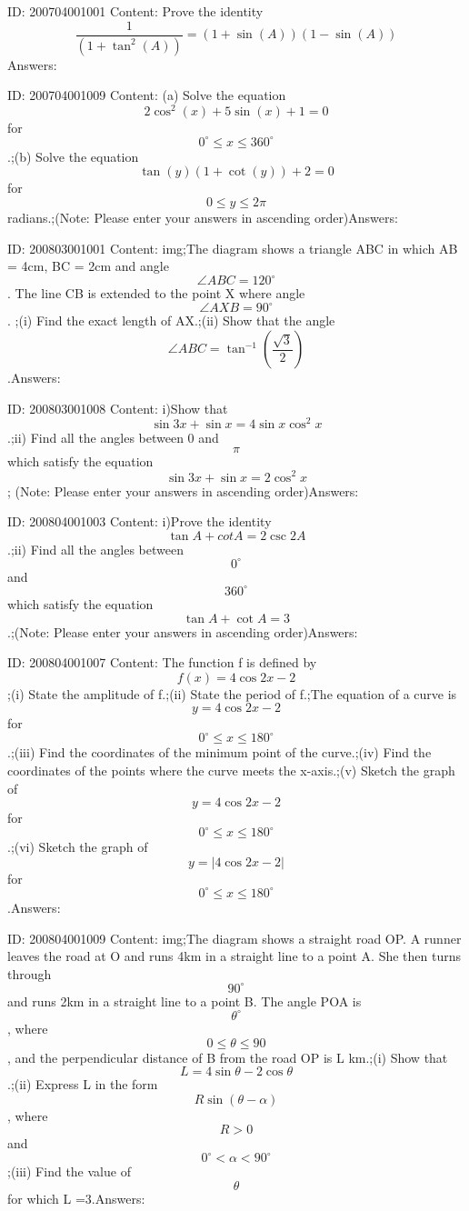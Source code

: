 \documentclass{article}
\begin{document}
ID: 200704001001
Content:
Prove the identity $$\frac{1}{(1+\tan ^2(A))}=(1+\sin (A))(1-\sin (A))$$Answers:

ID: 200704001009
Content:
(a) Solve the equation $$2\cos ^2(x)+5\sin (x)+1=0$$ for $$0^{\circ}\leq x\leq360^{\circ}$$.;(b)	Solve the equation $$\tan (y)(1+\cot (y))+2=0$$ for $$0\leq y\leq2\pi$$ radians.;(Note: Please enter your answers in ascending order)Answers:

ID: 200803001001
Content:
img;The diagram shows a triangle ABC in which AB = 4cm, BC = 2cm and angle $$ \angle ABC=120^{\circ}$$. The line CB is extended to the point X where angle $$ \angle AXB=90^{\circ}$$. ;(i) Find the exact length of AX.;(ii) Show that the angle $$ \angle ABC= \tan^{-1}(\frac{\sqrt{3}}{2})$$.Answers:

ID: 200803001008
Content:
i)Show that $$\sin 3x + \sin  x = 4 \sin  x \cos ^2 x$$.;ii) Find all the angles between 0 and $$\pi$$ which satisfy the equation $$\sin  3x + \sin  x = 2 \cos ^2x$$; (Note: Please enter your answers in ascending order)Answers:

ID: 200804001003
Content:
i)Prove the identity $$\tan A +cot A = 2 \csc 2A$$.;ii) Find all the angles between $$0^{\circ} $$ and $$360^{\circ} $$ which satisfy the equation $$\tan A + \cot A = 3$$.;(Note: Please enter your answers in ascending order)Answers:

ID: 200804001007
Content:
The function f is defined by $$f(x) = 4\cos  2x -2$$;(i) State the amplitude of f.;(ii) State the period of f.;The equation of a curve is $$y = 4\cos 2x-2$$ for $$0^{\circ} \leq x \leq 180^{\circ} $$.;(iii) Find the coordinates of the minimum point of the curve.;(iv) Find the coordinates of the points where the curve meets the x-axis.;(v) Sketch the graph of $$y = 4\cos 2x-2$$ for $$0^{\circ}  \leq x \leq 180^{\circ} $$.;(vi) Sketch the graph of $$y =|4\cos 2x-2|$$ for $$0^{\circ}  \leq x \leq 180^{\circ} $$.Answers:

ID: 200804001009
Content:
img;The diagram shows a straight road OP. A runner leaves the road at O and runs 4km in a straight line to a point A. She then turns through $$90^{\circ} $$ and runs 2km in a straight line to a point B. The angle POA is $$\theta^{\circ} $$, where $$0\leq \theta \leq 90$$, and the perpendicular distance of B from the road OP is L km.;(i) Show that $$L = 4 \sin  \theta - 2\cos  \theta$$.;(ii) Express L in the form $$R \sin (\theta - \alpha)$$, where $$R>0$$ and $$0^{\circ} <\alpha<90^{\circ} $$;(iii) Find the value of $$\theta$$ for which L =3.Answers:
\end{document}
